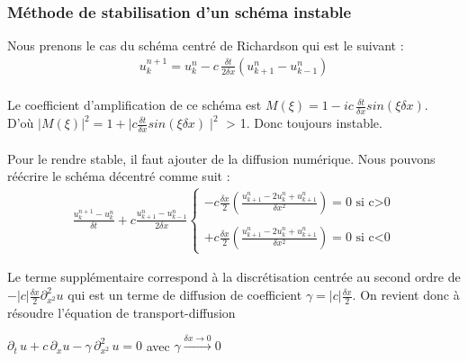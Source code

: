 \documentclass[12pt]{article}
\begin{document}
\subsubsection{Méthode de stabilisation d'un schéma instable}
\noindent Nous prenons le cas du schéma centré de Richardson qui est le suivant :
\begin{eqnarray*}
         u_k^{n+1} = u_k^n - c \, \frac{\delta t}{2\delta x}(u_{k+1}^n - u_{k-1}^n)
\end{eqnarray*}
\\
Le coefficient d’amplification de ce schéma est $M(\xi) = 1 - ic\,\displaystyle \frac{\delta t}{\delta x} sin(\xi \delta x)$.
\\D'où $|M(\xi)|^2 = 1 + \mid c\displaystyle\frac{\delta t}{\delta x} sin(\xi \delta x)\mid^2$ > 1. Donc toujours instable.\\\\
Pour le rendre stable, il faut ajouter de la diffusion numérique. Nous pouvons réécrire le schéma décentré comme suit :
\begin{eqnarray*}
	\frac{u_k^{n+1} - u_k^n}{\delta t} + c\frac{u_{k+1}^n - u_{k-1}^n}{2\delta x}
	\left\{ 
		\begin{array}{llll}
			-c \displaystyle \frac{\delta x }{2}(\frac{u_{k+1}^n - 2u_{k}^n + u_{k+1}^n}{\delta x^2}) = 0 \mbox{ si c>0}
			\\
			\\
			+c \displaystyle \frac{\delta x }{2}(\frac{u_{k+1}^n - 2u_k^n + u_{k+1}^n}{\delta x^2}) = 0 \mbox{ si c<0}
		\end{array} 
	\right.
\end{eqnarray*}


\noindent Le terme supplémentaire correspond à la discrétisation centrée au second ordre de $\displaystyle -|c|\frac{\delta x}{2}\partial_{x^2}^2 u$ qui est un terme de diffusion de coefficient $\displaystyle \gamma =  |c|\frac{\delta x}{2}.$ On revient donc à résoudre l'équation de transport-diffusion \cite{ref8}
\begin{center}
   $\displaystyle \partial_t \,u + c\, \partial_x u - \gamma \, \partial_{x^2}^2 \, u = 0$ avec $\displaystyle \gamma \xrightarrow{\delta x \rightarrow 0} 0$ 
\end{center}
\end{document}
